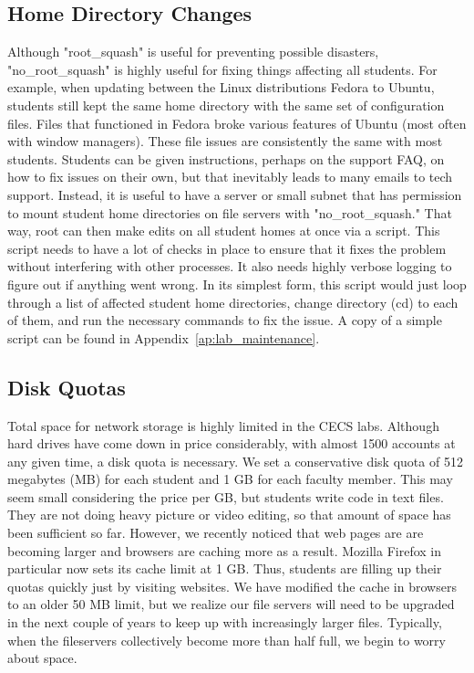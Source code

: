 \subsection{Home Directory Changes}
Although "root\_squash" is useful for preventing possible disasters, "no\_root\_squash" is highly useful for fixing things affecting all students.  For example, when updating between the Linux distributions Fedora to Ubuntu, students still kept the same home directory with the same set of configuration files.  Files that functioned in Fedora broke various features of Ubuntu (most often with window managers).  These file issues are consistently the same with most students. Students can be given instructions, perhaps on the support FAQ, on how to fix issues on their own, but that inevitably leads to many emails to tech support.  Instead, it is useful to have a server or small subnet that has permission to mount student home directories on file servers with "no\_root\_squash."  That way, root can then make edits on all student homes at once via a script.  This script needs to have a lot of checks in place to ensure that it fixes the problem without interfering with other processes.  It also needs highly verbose logging to figure out if anything went wrong.  In its simplest form, this script would just loop through a list of affected student home directories, change directory (cd) to each of them, and run the necessary commands to fix the issue.  A copy of a simple script can be found in Appendix~\ref{ap:lab_maintenance}.

\subsection{Disk Quotas}
Total space for network storage is highly limited in the CECS labs.  Although hard drives have come down in price considerably, with almost 1500 accounts at any given time, a disk quota is necessary.  We set a conservative disk quota of 512 megabytes (MB) for each student and 1 GB for each faculty member.  This may seem small considering the price per GB, but students write code in text files.  They are not doing heavy picture or video editing, so that amount of space has been sufficient so far.  However, we recently noticed that web pages are are becoming larger and browsers are caching more as a result.  Mozilla Firefox in particular now sets its cache limit at 1 GB.  Thus, students are filling up their quotas quickly just by visiting websites.  We have modified the cache in browsers to an older 50 MB limit, but we realize our file servers will need to be upgraded in the next couple of years to keep up with increasingly larger files.  Typically, when the fileservers collectively become more than half full, we begin to worry about space.  


